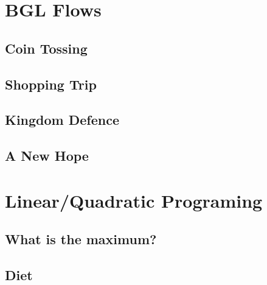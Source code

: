 \documentclass[10pt,a4paper,twoside]{report}
\begin{document}
\newpage
\section{BGL Flows}

\subsection*{Coin Tossing}
\begin{keywords}\end{keywords}


\newpage
\subsection*{Shopping Trip}
\begin{keywords}\end{keywords}


\newpage
\subsection*{Kingdom Defence}
\begin{keywords}\end{keywords}


\newpage
\subsection*{A New Hope}
\begin{keywords}\end{keywords}



\newpage
\section{Linear/Quadratic Programing}

\subsection*{What is the maximum?}
\begin{keywords}\end{keywords}


\newpage
\subsection*{Diet}
\begin{keywords}\end{keywords}

\end{document}
